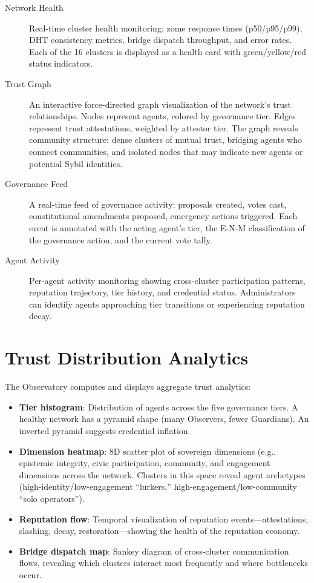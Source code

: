 \documentclass[12pt]{book}
\begin{document}
\begin{description}
  \item[Network Health] Real-time cluster health monitoring: zome response
    times (p50/p95/p99), DHT consistency metrics, bridge dispatch
    throughput, and error rates. Each of the 16 clusters is displayed as
    a health card with green/yellow/red status indicators.
  \item[Trust Graph] An interactive force-directed graph visualization of
    the network's trust relationships. Nodes represent agents, colored by
    governance tier. Edges represent trust attestations, weighted by
    attestor tier. The graph reveals community structure: dense clusters
    of mutual trust, bridging agents who connect communities, and isolated
    nodes that may indicate new agents or potential Sybil identities.
  \item[Governance Feed] A real-time feed of governance activity: proposals
    created, votes cast, constitutional amendments proposed, emergency
    actions triggered. Each event is annotated with the acting agent's
    tier, the E-N-M classification of the governance action, and the
    current vote tally.
  \item[Agent Activity] Per-agent activity monitoring showing cross-cluster
    participation patterns, reputation trajectory, tier history, and
    credential status. Administrators can identify agents approaching
    tier transitions or experiencing reputation decay.
\end{description}

\section{Trust Distribution Analytics}

The Observatory computes and displays aggregate trust analytics:

\begin{itemize}
  \item \textbf{Tier histogram}: Distribution of agents across the five
    governance tiers. A healthy network has a pyramid shape (many Observers,
    fewer Guardians). An inverted pyramid suggests credential inflation.
  \item \textbf{Dimension heatmap}: 8D scatter plot of sovereign dimensions (e.g., epistemic integrity, civic participation,
    community, and engagement dimensions across the network. Clusters in
    this space reveal agent archetypes (high-identity/low-engagement
    ``lurkers,'' high-engagement/low-community ``solo operators'').
  \item \textbf{Reputation flow}: Temporal visualization of reputation
    events---attestations, slashing, decay, restoration---showing the
    health of the reputation economy.
  \item \textbf{Bridge dispatch map}: Sankey diagram of cross-cluster
    communication flows, revealing which clusters interact most frequently
    and where bottlenecks occur.
\end{itemize}
\end{document}
